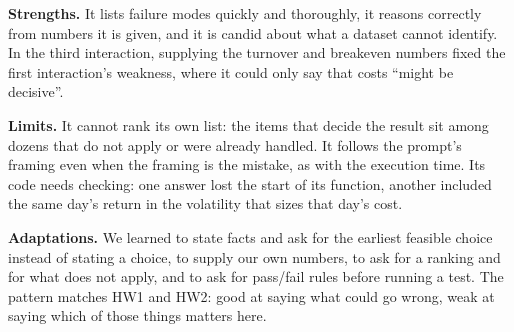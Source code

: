 \documentclass[11pt,letterpaper]{article}
\begin{document}
\textbf{Strengths.} It lists failure modes quickly and thoroughly, it reasons
correctly from numbers it is given, and it is candid about what a dataset
cannot identify. In the third interaction, supplying the turnover and
breakeven numbers fixed the first interaction's weakness, where it could only
say that costs ``might be decisive''.

\textbf{Limits.} It cannot rank its own list: the items that decide the result
sit among dozens that do not apply or were already handled. It follows the
prompt's framing even when the framing is the mistake, as with the execution
time. Its code needs checking: one answer lost the start of its function,
another included the same day's return in the volatility that sizes that
day's cost.

\textbf{Adaptations.} We learned to state facts and ask for the earliest
feasible choice instead of stating a choice, to supply our own numbers, to ask
for a ranking and for what does not apply, and to ask for pass/fail rules
before running a test. The pattern matches HW1 and HW2: good at saying what
could go wrong, weak at saying which of those things matters here.


\end{document}
